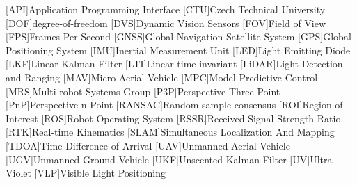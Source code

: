 
\begin{acronym}
  [API]{Application Programming Interface}
  [CTU]{Czech Technical University}
  [DOF]{degree-of-freedom}
  [DVS]{Dynamic Vision Sensors}
  [FOV]{Field of View}
  [FPS]{Frames Per Second}
  [GNSS]{Global Navigation Satellite System}
  [GPS]{Global Positioning System}
  [IMU]{Inertial Measurement Unit}
  [LED]{Light Emitting Diode}
  [LKF]{Linear Kalman Filter}
  [LTI]{Linear time-invariant}
  [LiDAR]{Light Detection and Ranging}
  [MAV]{Micro Aerial Vehicle}
  [MPC]{Model Predictive Control}
  [MRS]{Multi-robot Systems Group}
  [P3P]{Perspective-Three-Point}
  [PnP]{Perspective-n-Point}
  [RANSAC]{Random sample consensus}
  [ROI]{Region of Interest}
  [ROS]{Robot Operating System}
  [RSSR]{Received Signal Strength Ratio}
  [RTK]{Real-time Kinematics}
  [SLAM]{Simultaneous Localization And Mapping}
  [TDOA]{Time Difference of Arrival}
  [UAV]{Unmanned Aerial Vehicle}
  [UGV]{Unmanned Ground Vehicle}
  [UKF]{Unscented Kalman Filter}
  [UV]{Ultra Violet}
  [VLP]{Visible Light Positioning}
\end{acronym}
